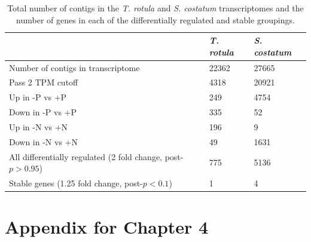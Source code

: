 \begin{table}[h!]
\centering
\caption[Mapping statistics for \textit{T. rotula} and \textit{S. costatum} transcriptomes]{Total number of contigs in the \textit{T. rotula} and \textit{S. costatum} transcriptomes and the number of genes in each of the differentially regulated and stable groupings.}
\label{tab:a3t3}
\begin{tabular}{|l|l|l|}
\hline
                                                                       & \textit{\textbf{T. rotula}} & \textit{\textbf{S. costatum}} \\ \hline
Number of contigs in transcriptome                                     & 22362                       & 27665                         \\ \hline
Pass 2 TPM cutoff                                                      & 4318                        & 20921                         \\ \hline
Up in -P vs +P                                                         & 249                         & 4754                          \\ \hline
Down in -P vs +P                                                       & 335                         & 52                            \\ \hline
Up in -N vs +N                                                         & 196                         & 9                             \\ \hline
Down in -N vs +N                                                       & 49                          & 1631                          \\ \hline
All differentially regulated (2 fold change, post-$p > 0.95$) & 775                         & 5136                          \\ \hline
Stable genes (1.25 fold change, post-$p < 0.1$)                  & 1                           & 4                             \\ \hline
\end{tabular}
\end{table}








\clearpage

\section{Appendix for Chapter 4}
